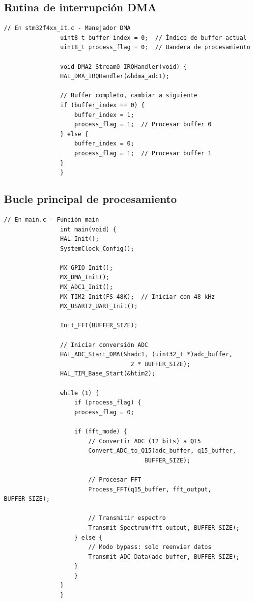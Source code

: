 \documentclass[12pt]{article}
\begin{document}
		\subsection{Rutina de interrupción DMA}

			\begin{lstlisting}[style=mystyle, caption=Manejador de interrupción DMA]
				// En stm32f4xx_it.c - Manejador DMA
				uint8_t buffer_index = 0;  // Índice de buffer actual
				uint8_t process_flag = 0;  // Bandera de procesamiento

				void DMA2_Stream0_IRQHandler(void) {
				HAL_DMA_IRQHandler(&hdma_adc1);
				
				// Buffer completo, cambiar a siguiente
				if (buffer_index == 0) {
					buffer_index = 1;
					process_flag = 1;  // Procesar buffer 0
				} else {
					buffer_index = 0;
					process_flag = 1;  // Procesar buffer 1
				}
				}
			\end{lstlisting}

		\subsection{Bucle principal de procesamiento}

			\begin{lstlisting}[style=mystyle, caption=Bucle principal]
				// En main.c - Función main
				int main(void) {
				HAL_Init();
				SystemClock_Config();
				
				MX_GPIO_Init();
				MX_DMA_Init();
				MX_ADC1_Init();
				MX_TIM2_Init(FS_48K);  // Iniciar con 48 kHz
				MX_USART2_UART_Init();
				
				Init_FFT(BUFFER_SIZE);
				
				// Iniciar conversión ADC
				HAL_ADC_Start_DMA(&hadc1, (uint32_t *)adc_buffer, 
									2 * BUFFER_SIZE);
				HAL_TIM_Base_Start(&htim2);
				
				while (1) {
					if (process_flag) {
					process_flag = 0;
					
					if (fft_mode) {
						// Convertir ADC (12 bits) a Q15
						Convert_ADC_to_Q15(adc_buffer, q15_buffer, 
										BUFFER_SIZE);
						
						// Procesar FFT
						Process_FFT(q15_buffer, fft_output, BUFFER_SIZE);
						
						// Transmitir espectro
						Transmit_Spectrum(fft_output, BUFFER_SIZE);
					} else {
						// Modo bypass: solo reenviar datos
						Transmit_ADC_Data(adc_buffer, BUFFER_SIZE);
					}
					}
				}
				}
			\end{lstlisting}
\end{document}
